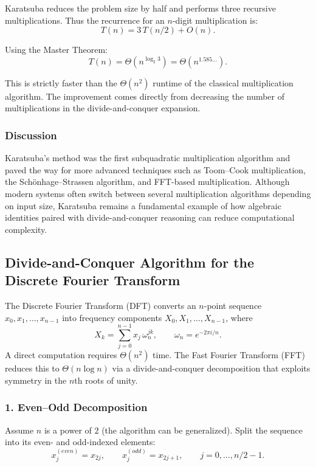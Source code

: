 \documentclass[9pt]{extarticle}
\begin{document}
Karatsuba reduces the problem size by half and performs three recursive
multiplications.  Thus the recurrence for an $n$-digit multiplication is:
\[
    T(n) = 3\,T(n/2) + O(n).
\]

Using the Master Theorem:
\[
    T(n) = \Theta\!\left( n^{\log_2 3} \right)
         = \Theta(n^{1.585\ldots}).
\]

This is strictly faster than the $\Theta(n^2)$ runtime of the classical
multiplication algorithm.  The improvement comes directly from decreasing the 
number of multiplications in the divide-and-conquer expansion.

\subsubsection*{Discussion}

Karatsuba's method was the first subquadratic multiplication algorithm and
paved the way for more advanced techniques such as Toom--Cook multiplication,
the Schönhage--Strassen algorithm, and FFT-based multiplication.  
Although modern systems often switch between several multiplication algorithms
depending on input size, Karatsuba remains a fundamental example of how 
algebraic identities paired with divide-and-conquer reasoning can reduce 
computational complexity.


\subsection{Divide-and-Conquer Algorithm for the Discrete Fourier Transform}

The Discrete Fourier Transform (DFT) converts an $n$-point sequence
$x_0, x_1, \dots, x_{n-1}$ into frequency components
$X_0, X_1, \dots, X_{n-1}$, where
\[
X_k = \sum_{j=0}^{n-1} x_j \,\omega_n^{jk}, \qquad 
\omega_n = e^{-2\pi i / n}.
\]
A direct computation requires $\Theta(n^2)$ time.  
The Fast Fourier Transform (FFT) reduces this to $\Theta(n \log n)$ via a
divide-and-conquer decomposition that exploits symmetry in the $n$th roots of unity.

\subsubsection*{1. Even–Odd Decomposition}

Assume $n$ is a power of $2$ (the algorithm can be generalized).
Split the sequence into its even- and odd-indexed elements:
\[
x^{(even)}_j = x_{2j}, \qquad
x^{(odd)}_j  = x_{2j+1}, \qquad j = 0,\dots,n/2-1.
\]
\end{document}
